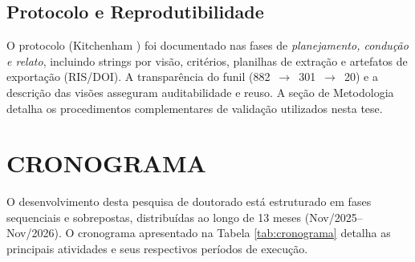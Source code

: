 \documentclass[12pt,a4paper]{article}
\begin{document}
\subsection{Protocolo e Reprodutibilidade}

O protocolo (Kitchenham \cite{kitchenham2004}) foi documentado nas fases de \emph{planejamento, condução e relato}, incluindo strings por visão, critérios, planilhas de extração e artefatos de exportação (RIS/DOI). A transparência do funil (882 \,$\to$\, 301 \,$\to$\, 20) e a descrição das visões asseguram auditabilidade e reuso. A seção de Metodologia detalha os procedimentos complementares de validação utilizados nesta tese.

\section{CRONOGRAMA}

O desenvolvimento desta pesquisa de doutorado está estruturado em fases
sequenciais e sobrepostas, distribuídas ao longo de 13 meses (Nov/2025–Nov/2026). O cronograma
apresentado na Tabela \ref{tab:cronograma} detalha as principais atividades e
seus respectivos períodos de execução.
\end{document}
